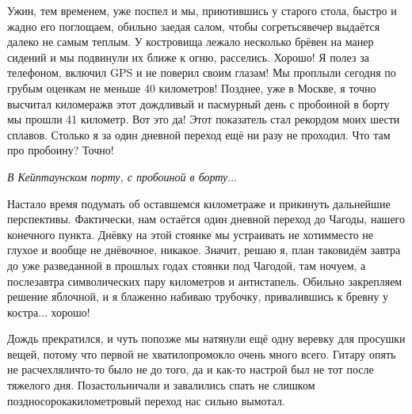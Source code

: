 Ужин, тем временем, уже поспел и мы, приютившись у старого стола, быстро и жадно его поглощаем, обильно заедая салом, чтобы согреться\mdash вечер выдаётся далеко не самым теплым. У костровища лежало несколько брёвен на манер сидений и мы подвинули их ближе к огню, расселись. Хорошо! Я полез за телефоном, включил GPS и не поверил своим глазам! Мы проплыли сегодня по грубым оценкам не меньше 40 километров! Позднее, уже в Москве, я точно высчитал киломераж\mdash в этот дождливый и пасмурный день с пробоиной в борту мы прошли 41 километр. Вот это да! Этот показатель стал рекордом моих шести сплавов. Столько я за один дневной переход ещё ни разу не проходил. Что там про пробоину? Точно! 

\vspace{0.1cm}
\noindent\textit{%
	\hspace*{1.0cm}В Кейптаунском порту, с пробоиной в борту$\ldots$
}
\vspace{0.1cm}

Настало время подумать об оставшемся километраже и прикинуть дальнейшие перспективы. Фактически, нам остаётся один дневной переход до Чагоды, нашего конечного пункта. Днёвку на этой стоянке мы устраивать не хотим\mdash место не глухое и вообще не днёвочное, никакое. Значит, решаю я, план таков\mdash идём завтра до уже разведанной в прошлых годах стоянки под Чагодой, там ночуем, а послезавтра символических пару километров и антистапель. Обильно закрепляем решение яблочной, и я блаженно набиваю трубочку, привалившись к бревну у костра$\ldots$ хорошо! 

Дождь прекратился, и чуть попозже мы натянули ещё одну веревку для просушки вещей, потому что первой не хватило\mdash промокло очень много всего. Гитару опять не расчехляли\mdash что-то было не до того, да и как-то настрой был не тот после тяжелого дня. Позастольничали и завалились спать не слишком поздно\mdash сорокакилометровый переход нас сильно вымотал.

\begin{center}
\end{center}
